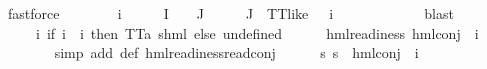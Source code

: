 \begin{isabellebody}
\ fastforce\ \isanewline
\ \ \ \ \isamarkupfalse%
\ {\isasymphi}\ i{\isacharunderscore}{\kern0pt}{\isasymphi}\ \ {\isachardoublequoteopen}{\isasymphi}\ {\isasymin}\ {\isasymPhi}\ {\isacharbackquote}{\kern0pt}\ I\ {\isasyminter}\ {\isasymPhi}\ {\isacharbackquote}{\kern0pt}\ J\ {\isasymor}\ {\isacharparenleft}{\kern0pt}{\isasymphi}\ {\isasymin}\ {\isasymPhi}\ {\isacharbackquote}{\kern0pt}\ J\ {\isasymand}\ TT{\isacharunderscore}{\kern0pt}like\ {\isasymphi}{\isacharparenright}{\kern0pt}{\isachardoublequoteclose}\ {\isachardoublequoteopen}{\isasymPhi}\ i{\isacharunderscore}{\kern0pt}{\isasymphi}\ {\isacharequal}{\kern0pt}\ {\isasymphi}{\isachardoublequoteclose}\isanewline
\ \ \ \ \ \ \isamarkupfalse%
\ {}\ \isamarkupfalse%
\ blast\isanewline
\ \ \ \ \isamarkupfalse%
\ {\isasymPsi}\ \ {\isachardoublequoteopen}{\isasymPsi}\ {\isasymequiv}\ {\isacharparenleft}{\kern0pt}{\isasymlambda}i{\isachardot}{\kern0pt}\ {\isacharparenleft}{\kern0pt}if\ i\ {\isacharequal}{\kern0pt}\ i{\isacharunderscore}{\kern0pt}{\isasymphi}\ then\ TT{\isacharcolon}{\kern0pt}{\isacharcolon}{\kern0pt}{\isacharparenleft}{\kern0pt}{\isacharprime}{\kern0pt}a{\isacharcomma}{\kern0pt}\ {\isacharprime}{\kern0pt}s{\isacharparenright}{\kern0pt}hml\ else\ undefined{\isacharparenright}{\kern0pt}{\isacharparenright}{\kern0pt}{\isachardoublequoteclose}\isanewline
\ \ \ \ \isamarkupfalse%
\ {\isachardoublequoteopen}hml{\isacharunderscore}{\kern0pt}readiness\ {\isacharparenleft}{\kern0pt}hml{\isacharunderscore}{\kern0pt}conj\ {\isacharbraceleft}{\kern0pt}{\isacharbraceright}{\kern0pt}\ {\isacharbraceleft}{\kern0pt}i{\isacharunderscore}{\kern0pt}{\isasymphi}{\isacharbraceright}{\kern0pt}\ {\isasymPsi}{\isacharparenright}{\kern0pt}{\isachardoublequoteclose}\ \isanewline
\ \ \ \ \ \ \isamarkupfalse%
\ {\isacharparenleft}{\kern0pt}simp\ add{\isacharcolon}{\kern0pt}\ {\isasymPsi}{\isacharunderscore}{\kern0pt}def\ hml{\isacharunderscore}{\kern0pt}readiness{\isachardot}{\kern0pt}read{\isacharunderscore}{\kern0pt}conj{\isacharparenright}{\kern0pt}\isanewline
\ \ \ \ \isamarkupfalse%
\ {\isachardoublequoteopen}{\isasymforall}s{\isachardot}{\kern0pt}\ {\isasymnot}s\ {\isasymTurnstile}\ {\isacharparenleft}{\kern0pt}hml{\isacharunderscore}{\kern0pt}conj\ {\isacharbraceleft}{\kern0pt}{\isacharbraceright}{\kern0pt}\ {\isacharbraceleft}{\kern0pt}i{\isacharunderscore}{\kern0pt}{\isasymphi}{\isacharbraceright}{\kern0pt}\ {\isasymPsi}{\isacharparenright}{\kern0pt}{\isachardoublequoteclose}\ \isanewline

\end{isabellebody}
